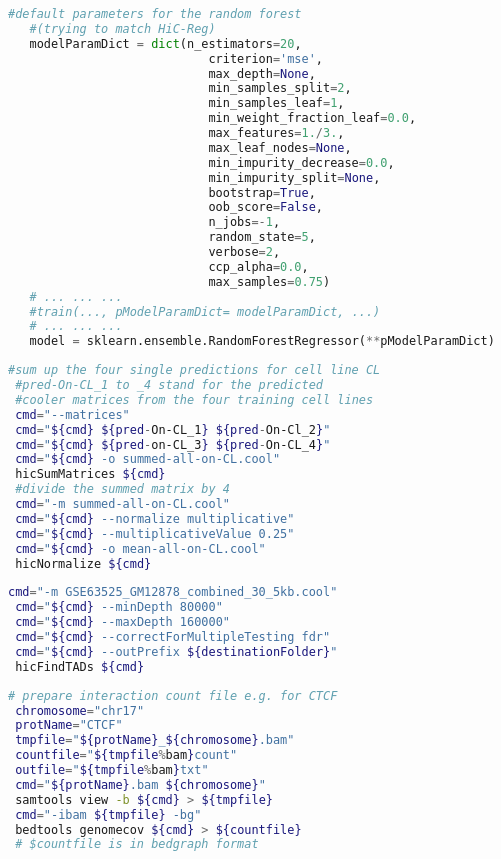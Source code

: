 \begin{appendices}
\begin{lstlisting}[language=python, caption=hicprediction random forest, label=list:methods:RandomForestRegressor]
   #default parameters for the random forest 
   #(trying to match HiC-Reg)
   modelParamDict = dict(n_estimators=20,
                            criterion='mse', 
                            max_depth=None, 
                            min_samples_split=2, 
                            min_samples_leaf=1, 
                            min_weight_fraction_leaf=0.0, 
                            max_features=1./3.,
                            max_leaf_nodes=None, 
                            min_impurity_decrease=0.0, 
                            min_impurity_split=None, 
                            bootstrap=True, 
                            oob_score=False, 
                            n_jobs=-1, 
                            random_state=5, 
                            verbose=2, 
                            ccp_alpha=0.0, 
                            max_samples=0.75)
   # ... ... ...
   #train(..., pModelParamDict= modelParamDict, ...)
   # ... ... ... 
   model = sklearn.ensemble.RandomForestRegressor(**pModelParamDict)
\end{lstlisting}

\begin{lstlisting}[language=bash, caption=compute mean prediction, label=list:methods:averagePredictions]
 #sum up the four single predictions for cell line CL
 #pred-On-CL_1 to _4 stand for the predicted
 #cooler matrices from the four training cell lines
 cmd="--matrices"
 cmd="${cmd} ${pred-On-CL_1} ${pred-On-Cl_2}"
 cmd="${cmd} ${pred-on-CL_3} ${pred-On-CL_4}"
 cmd="${cmd} -o summed-all-on-CL.cool"
 hicSumMatrices ${cmd}
 #divide the summed matrix by 4
 cmd="-m summed-all-on-CL.cool"
 cmd="${cmd} --normalize multiplicative"
 cmd="${cmd} --multiplicativeValue 0.25"
 cmd="${cmd} -o mean-all-on-CL.cool"
 hicNormalize ${cmd}
\end{lstlisting}

\begin{lstlisting}[language=bash,caption=command for finding TADs on GM12878,label=methods:list:TADs]
 cmd="-m GSE63525_GM12878_combined_30_5kb.cool"
 cmd="${cmd} --minDepth 80000"
 cmd="${cmd} --maxDepth 160000"
 cmd="${cmd} --correctForMultipleTesting fdr"
 cmd="${cmd} --outPrefix ${destinationFolder}"
 hicFindTADs ${cmd}
\end{lstlisting}

\begin{lstlisting}[language=bash,caption=preparing inputs for HiC-Reg  (example),label=methods:list:hicregInputs]
 # prepare interaction count file e.g. for CTCF
 chromosome="chr17"
 protName="CTCF"
 tmpfile="${protName}_${chromosome}.bam"
 countfile="${tmpfile%bam}count"
 outfile="${tmpfile%bam}txt"
 cmd="${protName}.bam ${chromosome}"
 samtools view -b ${cmd} > ${tmpfile}
 cmd="-ibam ${tmpfile} -bg"
 bedtools genomecov ${cmd} > ${countfile}
 # $countfile is in bedgraph format


\end{lstlisting}
\end{appendices}
